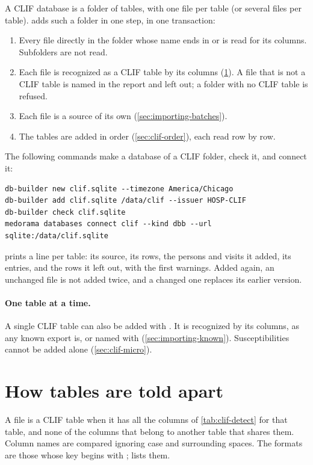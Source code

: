 A CLIF database is a folder of tables, with one file per table (or several files per table).
 adds such a folder in one step, in one transaction:
\begin{enumerate}
\item Every file directly in the folder whose name ends in  or  is read
  for its columns. Subfolders are not read.
\item Each file is recognized as a CLIF table by its columns (\cref{sec:clif-detect}). A file
  that is not a CLIF table is named in the report and left out; a folder with no CLIF table is
  refused.
\item Each file is a source of its own (\cref{sec:importing-batches}).
\item The tables are added in order (\cref{sec:clif-order}), each read row by row.
\end{enumerate}
The following commands make a database of a CLIF folder, check it, and connect it:
\begin{lstlisting}[style=shell]
db-builder new clif.sqlite --timezone America/Chicago
db-builder add clif.sqlite /data/clif --issuer HOSP-CLIF
db-builder check clif.sqlite
medorama databases connect clif --kind dbb --url sqlite:/data/clif.sqlite
\end{lstlisting}
 prints a line per table: its source, its rows, the persons and visits it added, its
entries, and the rows it left out, with the first warnings. Added again, an unchanged file is not
added twice, and a changed one replaces its earlier version.

\paragraph{One table at a time.} A single CLIF table can also be added with .
It is recognized by its columns, as any known export is, or named with  (\cref{sec:importing-known}). Susceptibilities cannot be added alone
(\cref{sec:clif-micro}).

\section{How tables are told apart}
\label{sec:clif-detect}

A file is a CLIF table when it has all the columns of \cref{tab:clif-detect} for that table, and
none of the columns that belong to another table that shares them. Column names are compared
ignoring case and surrounding spaces. The formats are those whose key begins with ;
 lists them.

